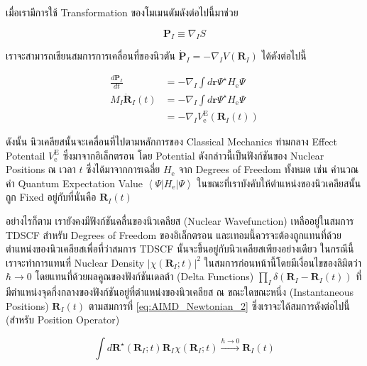 เมื่อเรามีการใช้ Transformation ของโมเมนตัมดังต่อไปนี้มาช่วย

\begin{equation}
  \mathbf{P}_I \equiv \nabla_I S
\end{equation}

\noindent เราจะสามารถเขียนสมการการเคลื่อนที่ของนิวตัน $\dot{\mathbf{P}}_I = -\nabla_I V\left(\mathbf{R}_I\right)$
ได้ดังต่อไปนี้

\begin{align}
  \label{eq:AIMD_Newtonian_1}
  \frac{d \mathbf{P}_I}{d t} & =-\nabla_I \int d \mathbf{r} \Psi^{\star} H_{\mathrm{e}} \Psi      \\
  \label{eq:AIMD_Newtonian_2}
  M_I \ddot{\mathbf{R}}_I(t) & =-\nabla_I \int d \mathbf{r} \Psi^{\star} H_{\mathrm{e}} \Psi      \\
  \label{eq:AIMD_Newtonian_3}
                             & =-\nabla_I V_{\mathrm{e}}^{\mathrm{E}}\left(\mathbf{R}_I(t)\right)
\end{align}

ดังนั้น นิวเคลียสนั้นจะเคลื่อนที่ไปตามหลักการของ Classical Mechanics ท่ามกลาง Effect Potentail $V_{\mathrm{e}}^{\mathrm{E}}$
ซึ่งมาจากอิเล็กตรอน โดย Potential ดังกล่าวนี้เป็นฟังก์ชันของ Nuclear Positions ณ เวลา $t$ ซึ่งได้มาจากการเฉลี่ย
$H_{\mathrm{e}}$ จาก Degrees of Freedom ทั้งหมด เช่น คำนวณค่า Quantum Expectation Value
$\left\langle\Psi\left|H_{\mathrm{e}}\right| \Psi\right\rangle$ ในขณะที่เราบังคับให้ตำแหน่งของนิวเคลียสนั้นถูก
Fixed อยู่กับที่นั่นคือ $\mathbf{R}_I(t)$

อย่างไรก็ตาม เรายังคงมีฟังก์ชันคลื่นของนิวเคลียส (Nuclear Wavefunction) เหลืออยู่ในสมการ TDSCF สำหรับ Degrees of Freedom ของอิเล็กตรอน
และเทอมนี้ควรจะต้องถูกแทนที่ด้วยตำแหน่งของนิวเคลียสเพื่อที่ว่าสมการ TDSCF นั้นจะขึ้นอยู่กับนิวเคลียสเพียงอย่างเดียว ในกรณีนี้เราจะทำการแทนที่
Nuclear Density $\left|\chi\left(\mathbf{R}_I ; t\right)\right|^2$ ในสมการก่อนหน้านี้โดยมีเงื่อนไขของลิมิตว่า
$\hbar \rightarrow 0$ โดยแทนที่ด้วยผลคูณของฟังก์ชันเดลต้า (Delta Functions)
$\prod_I \delta\left(\mathbf{R}_I-\mathbf{R}_I(t)\right)$ ที่มีตำแหน่งจุดกึ่งกลางของฟังก์ชันอยู่ที่ตำแหน่งของนิวเคลียส ณ
ขณะใดขณะหนึ่ง (Instantaneous Positions) $\mathbf{R}_I(t)$ ตามสมการที่ \eqref{eq:AIMD_Newtonian_2}
ซึ่งเราจะได้สมการดังต่อไปนี้ (สำหรับ Position Operator)

\begin{equation}
  \int d \mathbf{R}^{\star}\left(\mathbf{R}_I ; t\right) \mathbf{R}_I \chi\left(\mathbf{R}_I ; t\right)
  \stackrel{\hbar \rightarrow 0}{\longrightarrow}
  \mathbf{R}_I(t)
\end{equation}

